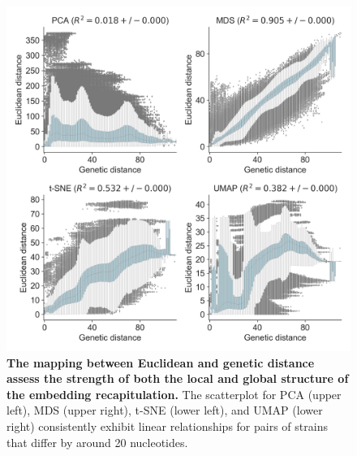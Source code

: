\documentclass[10pt,letterpaper]{article}
\begin{document}
\begin{figure}[!h]
\includegraphics[width=\columnwidth]{figures/sarscov2-euclidean-distance-by-genetic-distance.png}
\caption{{\bf The mapping between Euclidean and genetic distance assess the strength of both the local and global structure of the embedding recapitulation.}
The scatterplot for PCA (upper left), MDS (upper right), t-SNE (lower left), and UMAP (lower right) consistently exhibit linear relationships for pairs of strains that differ by around 20 nucleotides.}
\label{fig:sars-cov-2-pairwise-distances}
\end{figure}
\end{document}
